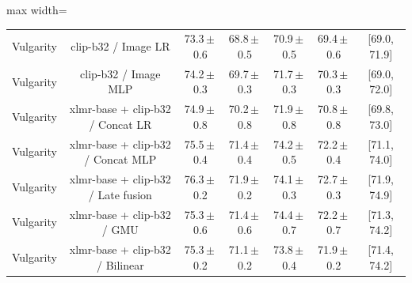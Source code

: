 \begin{table}[t]
\begin{adjustbox}{max width=\textwidth}
\begin{tabular}{lcccccc}
Vulgarity & clip-b32 / Image LR & 73.3\,$\pm$\,0.6 & 68.8\,$\pm$\,0.5 & 70.9\,$\pm$\,0.5 & 69.4\,$\pm$\,0.6 & [69.0, 71.9] \\
Vulgarity & clip-b32 / Image MLP & 74.2\,$\pm$\,0.3 & 69.7\,$\pm$\,0.3 & 71.7\,$\pm$\,0.3 & 70.3\,$\pm$\,0.3 & [69.0, 72.0] \\
Vulgarity & xlmr-base + clip-b32 / Concat LR & 74.9\,$\pm$\,0.8 & 70.2\,$\pm$\,0.8 & 71.9\,$\pm$\,0.8 & 70.8\,$\pm$\,0.8 & [69.8, 73.0] \\
Vulgarity & xlmr-base + clip-b32 / Concat MLP & 75.5\,$\pm$\,0.4 & 71.4\,$\pm$\,0.4 & 74.2\,$\pm$\,0.5 & 72.2\,$\pm$\,0.4 & [71.1, 74.0] \\
Vulgarity & xlmr-base + clip-b32 / Late fusion & 76.3\,$\pm$\,0.2 & 71.9\,$\pm$\,0.2 & 74.1\,$\pm$\,0.3 & 72.7\,$\pm$\,0.3 & [71.9, 74.9] \\
Vulgarity & xlmr-base + clip-b32 / GMU & 75.3\,$\pm$\,0.6 & 71.4\,$\pm$\,0.6 & 74.4\,$\pm$\,0.7 & 72.2\,$\pm$\,0.7 & [71.3, 74.2] \\
Vulgarity & xlmr-base + clip-b32 / Bilinear & 75.3\,$\pm$\,0.2 & 71.1\,$\pm$\,0.2 & 73.8\,$\pm$\,0.4 & 71.9\,$\pm$\,0.2 & [71.4, 74.2] \\
\bottomrule
\end{tabular}
\end{adjustbox}
\end{table}
